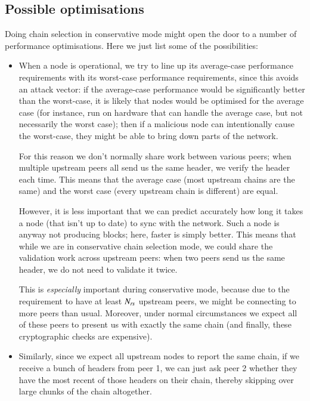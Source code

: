 \subsection{Possible optimisations}

Doing chain selection in conservative mode might open the door to a number
of performance optimisations. Here we just list some of the possibilities:

\begin{itemize}

\item When a node is operational, we try to line up its average-case performance
requirements with its worst-case performance requirements, since this avoids
an attack vector: if the average-case performance would be significantly better
than the worst-case, it is likely that nodes would be optimised for the average
case (for instance, run on hardware that can handle the average case, but not
necessarily the worst case); then if a malicious node can intentionally cause
the worst-case, they might be able to bring down parts of the network.

For this reason we don't normally share work between various peers; when
multiple upstream peers all send us the same header, we verify the header
each time. This means that the average case (most upstream chains are the same)
and the worst case (every upstream chain is different) are equal.

However, it is less important that we can predict accurately how long it takes
a node (that isn't up to date) to sync with the network. Such a node is anyway
not producing blocks; here, faster is simply better. This means that while we
are in conservative chain selection mode, we could share the validation work
across upstream peers: when two peers send us the same header, we do not need
to validate it twice.

This is \emph{especially} important during conservative mode, because due to the
requirement to have at least $N_\mathit{rs}$ upstream peers, we might be
connecting to more peers than usual. Moreover, under normal circumstances we
expect all of these peers to present us with exactly the same chain (and
finally, these cryptographic checks are expensive).

\item Similarly, since we expect all upstream nodes to report the same chain,
if we receive a bunch of headers from peer 1, we can just ask peer 2
whether they have the most recent of those headers on their chain, thereby
skipping over large chunks of the chain altogether.


\end{itemize}
